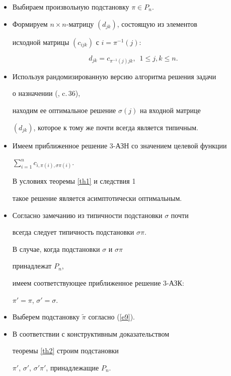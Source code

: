 \begin{itemize}


\item[1.] Выбираем произвольную подстановку $\pi \in P_n$.


\item[2.] Формируем $n \times n$-матрицу $ (d_{jk})$, состоящую из элементов 


исходной матрицы $(c_{ijk}) $ с $ i = \pi^{-1}(j)$: 


$$


d_{jk} = c_{\pi^{-1}(j)jk}, \ \; 1 \le j, k \le n.


$$ 


\item[3.] Используя рандомизированную версию алгоритма решения задачи


о назначении (\cite{GGS94}, c.\,36), 


находим ее оптимальное решение $\sigma(j)$ на входной матрице 


$(d_{jk})$, которое к тому же почти всегда является типичным.


\item[4.] Имеем приближенное решение 3-АЗН со значением целевой функции


$\sum\limits_{i=1}^{n} c_{i,\pi(i), \sigma \pi (i)}$.


В условиях теоремы \ref{th1} и следствия 1 


такое решение является асимптотически оптимальным.


\item[5.] Согласно замечанию из типичности подстановки $\sigma$ почти


всегда следует типичность подстановки $\sigma\pi$.


В случае, когда подстановки $ \sigma$ и $\sigma\pi$


принадлежат $P_n$,


имеем соответствующее приближенное решение 3-АЗК:


$\pi' = \pi$, $\sigma' = \sigma$.


\item[6.] Выберем подстановку $\widetilde \pi$ согласно (\ref{e9}).


\item[7.] В соответствии с конструктивным доказательством 


теоремы \ref{th2} строим подстановки 


$\pi'$, $\sigma'$, $\sigma'\pi'$, принадлежащие $ P_n$.


\end{itemize}


